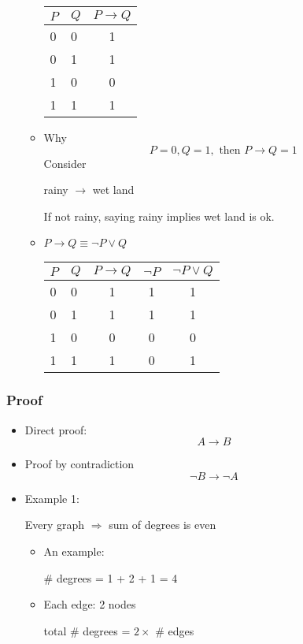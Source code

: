 \begin{frame}[allowframebreaks]
\begin{itemize}
\begin{itemize}
    \begin{center}
      \begin{tabular}{ll|c}
        $P$ & $Q$ & $P \rightarrow Q$ \\ \hline
        0& 0 & 1\\ 
        0& 1 & 1\\
        1& 0 & 0\\
        1& 1 & 1
      \end{tabular}
    \end{center}
  \item [] Why
    \begin{equation*}
      P = 0, Q = 1, \text{ then } P \rightarrow Q = 1
    \end{equation*}
Consider
\begin{center}
rainy $\rightarrow$ wet land
\end{center}
If not rainy, 
saying rainy implies wet land is ok.
\item $P \rightarrow Q \equiv 
\neg P \vee Q$
    \begin{center}
      \begin{tabular}{ll|c|cc}
        $P$ & $Q$ & $P \rightarrow Q$ & $\neg P$ & $\neg P \vee Q$\\ \hline
        0& 0 & 1 & 1 & 1\\ 
        0& 1 & 1 & 1 & 1\\
        1& 0 & 0 & 0 & 0\\
        1& 1 & 1 & 0 & 1
      \end{tabular}
    \end{center}
  \end{itemize}

\end{itemize}\end{frame} \begin{frame}[allowframebreaks] \frametitle{Proof}
  \begin{itemize}  
  \item Direct proof:
    $$A\rightarrow B$$
  \item Proof by contradiction
    $$\neg B \rightarrow \neg A$$

  \item Example 1:

Every graph $\Rightarrow$ sum of degrees is even
\begin{itemize}
\item An example:
    \begin{center}
\end{center}
\# degrees = 1 + 2 + 1 = 4
\item Each edge: 2 nodes
  \begin{center}
total \# degrees = $2\times $ \# edges
\end{center}
\end{itemize}


\end{itemize}
\end{frame}
